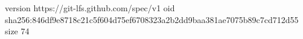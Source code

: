 version https://git-lfs.github.com/spec/v1
oid sha256:846df9e8718c21c5f604d75ef6708323a2b2dd9baa381ae7075b89c7cd712d55
size 74
